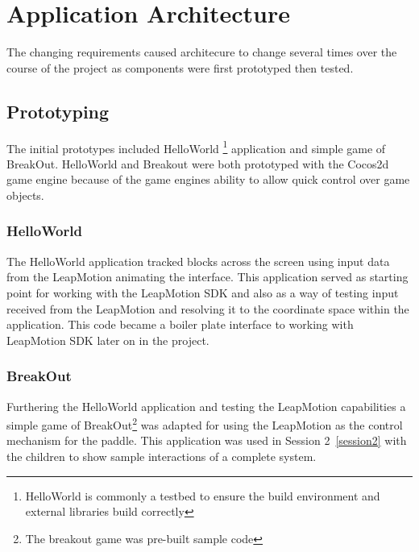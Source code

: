 
\chapter{Application Architecture} %

\label{Chapter4} %


The changing requirements caused architecure to change several times over the course of the project as components were first prototyped then tested. 

\section{Prototyping}

The initial prototypes included HelloWorld \footnote{HelloWorld is commonly a testbed to ensure the build environment and external libraries build correctly} application and simple game of BreakOut. HelloWorld and Breakout were both prototyped with the Cocos2d game engine because of the game engines ability to allow quick control over game objects. \cite{cocos2d} 


\subsection{HelloWorld}\label{HelloWorld_prototype}
The HelloWorld application tracked blocks across the screen using input data from the LeapMotion animating the interface. This application served as starting point for working with the LeapMotion SDK and also as a way of testing input received from the LeapMotion and resolving it to the coordinate space within the application. This code became a boiler plate interface to working with LeapMotion SDK later on in the project. 

\subsection{BreakOut}\label{breakout_prototype}
Furthering the HelloWorld application and testing the LeapMotion capabilities a simple game of BreakOut\footnote{The breakout game was pre-built sample code\cite{breakout}} was adapted for using the LeapMotion as the control mechanism for the paddle. This application was used in Session 2~\ref{session2} with the children to show sample interactions of a complete system. 

